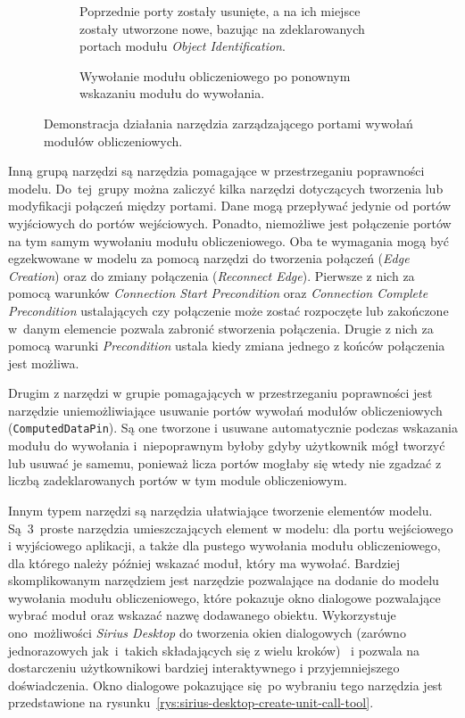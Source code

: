 \begin{figure}
\begin{subfigure}{.3\textwidth}
		\caption{Wywołanie modułu obliczeniowego po ponownym wskazaniu modułu do wywołania.}\label{
      rys:sirius-desktop-change-unit-to-call-after}
    \medskip
    {\small Poprzednie porty zostały usunięte, a na ich miejsce zostały
      utworzone nowe, bazując na zdeklarowanych portach modułu \emph{Object
      Identification}.}
	\end{subfigure}

	\caption{Demonstracja działania narzędzia zarządzającego portami wywołań
    modułów obliczeniowych.}\label{rys:sirius-desktop-change-unit-to-call}
\end{figure}

Inną grupą narzędzi są narzędzia pomagające w przestrzeganiu poprawności
modelu. Do~tej~grupy można zaliczyć kilka narzędzi dotyczących tworzenia lub
modyfikacji połączeń między portami. Dane mogą przepływać jedynie od portów
wyjściowych do portów wejściowych. Ponadto, niemożliwe jest połączenie portów
na tym samym wywołaniu modułu obliczeniowego. Oba te wymagania mogą być
egzekwowane w modelu za pomocą narzędzi do tworzenia połączeń (\emph{Edge
	Creation}) oraz do zmiany połączenia (\emph{Reconnect Edge}). Pierwsze
z nich za
pomocą warunków \emph{Connection Start Precondition} oraz
\emph{Connection Complete Precondition} ustalających czy połączenie może zostać
rozpoczęte lub zakończone w~danym elemencie pozwala zabronić stworzenia
połączenia. Drugie z nich za pomocą warunki \emph{Precondition} ustala kiedy
zmiana jednego z końców połączenia jest możliwa.

Drugim z narzędzi w grupie pomagających w przestrzeganiu poprawności jest
narzędzie uniemożliwiające usuwanie portów wywołań modułów obliczeniowych
(\texttt{ComputedDataPin}). Są one tworzone i usuwane automatycznie podczas
wskazania modułu do wywołania i~niepoprawnym byłoby gdyby użytkownik mógł
tworzyć lub usuwać je samemu, ponieważ licza portów mogłaby się wtedy nie
zgadzać z liczbą zadeklarowanych portów w tym module obliczeniowym.

Innym typem narzędzi są narzędzia ułatwiające tworzenie elementów modelu.
Są~3~proste narzędzia umieszczających element w modelu: dla portu wejściowego i
wyjściowego aplikacji, a także dla pustego wywołania modułu obliczeniowego, dla
którego należy później wskazać moduł, który ma wywołać. Bardziej skomplikowanym
narzędziem jest narzędzie pozwalające na dodanie do modelu wywołania modułu
obliczeniowego, które pokazuje okno dialogowe pozwalające wybrać moduł oraz
wskazać nazwę dodawanego obiektu. Wykorzystuje ono~możliwości \emph{Sirius
	Desktop} do tworzenia okien dialogowych (zarówno jednorazowych
jak~i~takich
składających się z wielu kroków)~\cite{sirius-desktop-documentation-tools} i
pozwala na dostarczeniu użytkownikowi
bardziej interaktywnego i przyjemniejszego doświadczenia. Okno dialogowe
pokazujące się po wybraniu
tego narzędzia jest przedstawione na
rysunku~\ref{rys:sirius-desktop-create-unit-call-tool}.

